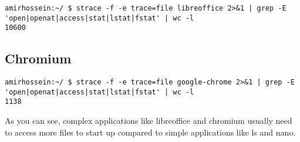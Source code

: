 \documentclass[12pt]{article}
\begin{document}
{\fontsize{8pt}{10pt}\selectfont
\begin{verbatim}
amirhossein:~/ $ strace -f -e trace=file libreoffice 2>&1 | grep -E 'open|openat|access|stat|lstat|fstat' | wc -l
10600
\end{verbatim}
}

\subsection{Chromium}

{\fontsize{8pt}{10pt}\selectfont
\begin{verbatim}
amirhossein:~/ $ strace -f -e trace=file google-chrome 2>&1 | grep -E 'open|openat|access|stat|lstat|fstat' | wc -l
1138
\end{verbatim}
}

As you can see, complex applications like libreoffice and chromium usually need to access more files to start up compared to simple applications like ls and nano.
\end{document}

